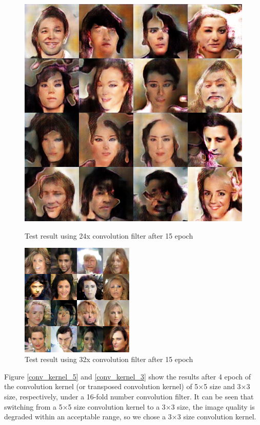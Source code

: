 \begin{figure}
\begin{minipage}[t]{0.48\linewidth}
        \includegraphics[width=\textwidth]{figures/result_conv_filter_24.png}
        \caption{Test result using 24x convolution filter after 15 epoch}
        \label{conv_filter_24}
    \end{minipage}
    \begin{minipage}[t]{\linewidth}
        \centering
        \includegraphics[width=0.48\textwidth]{figures/result_conv_filter_32.png}
        \caption{Test result using 32x convolution filter after 15 epoch}
        \label{conv_filter_32}
    \end{minipage}
\end{figure}

Figure \ref{conv_kernel_5} and \ref{conv_kernel_3} show the results after 4 epoch of the convolution kernel (or transposed convolution kernel) of 5×5 size and 3×3 size,
    respectively, under a 16-fold number convolution filter.
It can be seen that switching from a 5×5 size convolution kernel to a 3×3 size,
    the image quality is degraded within an acceptable range, so we chose a 3×3 size convolution kernel.

